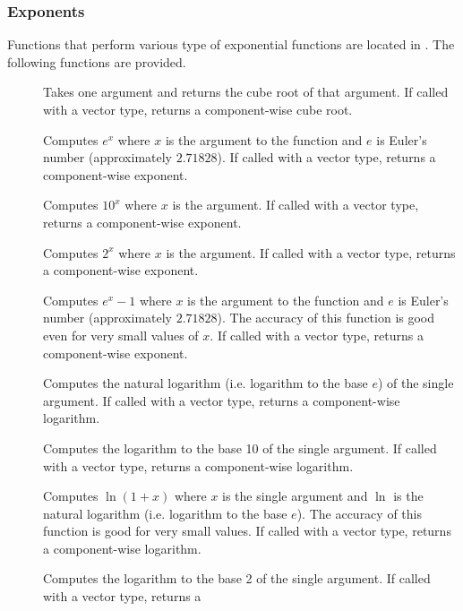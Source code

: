 \subsubsection{Exponents}

Functions that perform various type of exponential functions are located in
. The following functions are provided.

\begin{description}
\item[]  Takes one argument and returns the
  cube root of that argument. If called with a vector type, returns a
  component-wise cube root.
\item[]  Computes $e^x$ where $x$ is the
  argument to the function and $e$ is Euler's number (approximately
  $2.71828$). If called with a vector type, returns a component-wise
  exponent.
\item[] Computes $10^x$ where $x$ is the argument. If called
  with a vector type, returns a component-wise exponent.
\item[] Computes $2^x$ where $x$ is the argument. If called
  with a vector type, returns a component-wise exponent.
\item[] Computes $e^x-1$ where $x$ is the argument to the
  function and $e$ is Euler's number (approximately $2.71828$). The
  accuracy of this function is good even for very small values of $x$. If
  called with a vector type, returns a component-wise exponent.
\item[]   Computes
  the natural logarithm (i.e. logarithm to the base $e$) of the single
  argument. If called with a vector type, returns a component-wise
  logarithm.
\item[]  Computes the logarithm to the base
  10 of the single argument. If called with a vector type, returns a
  component-wise logarithm.
\item[]   Computes
  $\ln(1+x)$ where $x$ is the single argument and $\ln$ is the natural
  logarithm (i.e. logarithm to the base $e$). The accuracy of this function
  is good for very small values. If called with a vector type, returns a
  component-wise logarithm.
\item[]  Computes the logarithm to the base
  2 of the single argument. If called with a vector type, returns a

\end{description}
